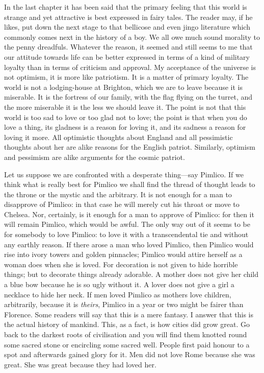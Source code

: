\documentclass{book}
\begin{document}
In the last chapter it has been said that the primary feeling that this world is strange and yet attractive is best expressed in fairy tales. The reader may, if he likes, put down the next stage to that bellicose and even jingo literature which commonly comes next in the history of a boy. We all owe much sound morality to the penny dreadfuls. Whatever the reason, it seemed and still seems to me that our attitude towards life can be better expressed in terms of a kind of military loyalty than in terms of criticism and approval. My acceptance of the universe is not optimism, it is more like patriotism. It is a matter of primary loyalty. The world is not a lodging-house at Brighton, which we are to leave because it is miserable. It is the fortress of our family, with the flag flying on the turret, and the more miserable it is the less we should leave it. The point is not that this world is too sad to love or too glad not to love; the point is that when you do love a thing, its gladness is a reason for loving it, and its sadness a reason for loving it more. All optimistic thoughts about England and all pessimistic thoughts about her are alike reasons for the English patriot. Similarly, optimism and pessimism are alike arguments for the cosmic patriot.

Let us suppose we are confronted with a desperate thing—say Pimlico. If we think what is really best for Pimlico we shall find the thread of thought leads to the throne or the mystic and the arbitrary. It is not enough for a man to disapprove of Pimlico: in that case he will merely cut his throat or move to Chelsea. Nor, certainly, is it enough for a man to approve of Pimlico: for then it will remain Pimlico, which would be awful. The only way out of it seems to be for somebody to love Pimlico: to love it with a transcendental tie and without any earthly reason. If there arose a man who loved Pimlico, then Pimlico would rise into ivory towers and golden pinnacles; Pimlico would attire herself as a woman does when she is loved. For decoration is not given to hide horrible things; but to decorate things already adorable. A mother does not give her child a blue bow because he is so ugly without it. A lover does not give a girl a necklace to hide her neck. If men loved Pimlico as mothers love children, arbitrarily, because it is \emph{theirs}, Pimlico in a year or two might be fairer than Florence. Some readers will say that this is a mere fantasy. I answer that this is the actual history of mankind. This, as a fact, is how cities did grow great. Go back to the darkest roots of civilisation and you will find them knotted round some sacred stone or encircling some sacred well. People first paid honour to a spot and afterwards gained glory for it. Men did not love Rome because she was great. She was great because they had loved her.
\end{document}
